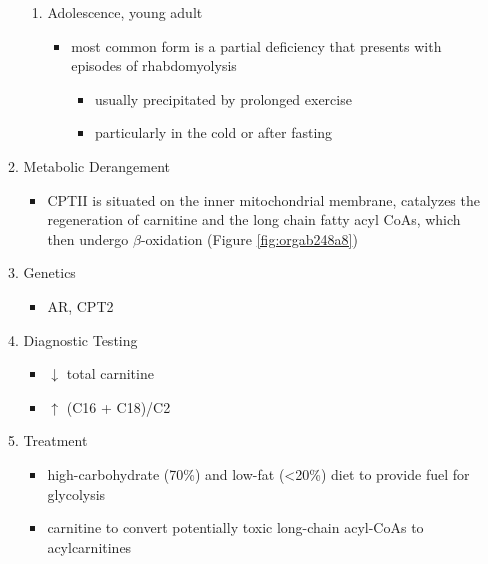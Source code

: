 \documentclass{scrartcl}
\begin{document}
\begin{enumerate}
\begin{enumerate}
\begin{enumerate}
\item Adolescence,  young adult
\label{sec:orge1957a0}
\begin{itemize}
\item most common form is a partial deficiency that presents with
episodes of rhabdomyolysis
\begin{itemize}
\item usually precipitated by prolonged exercise
\item particularly in the cold or after fasting
\end{itemize}
\end{itemize}
\end{enumerate}

\item Metabolic Derangement
\label{sec:org75e8d84}
\begin{itemize}
\item CPTII is situated on the inner mitochondrial membrane, catalyzes the
regeneration of carnitine and the long chain fatty acyl CoAs, which
then undergo \(\beta\)-oxidation (Figure \ref{fig:orgab248a8})
\end{itemize}
\item Genetics
\label{sec:orgf4c355b}
\begin{itemize}
\item AR, CPT2
\end{itemize}
\item Diagnostic Testing
\label{sec:orge432b8f}
\begin{itemize}
\item \(\downarrow\) total carnitine
\item \(\uparrow\) (C16 + C18)/C2
\end{itemize}

\item Treatment
\label{sec:org4908f09}
\begin{itemize}
\item high-carbohydrate (70\%) and low-fat (<20\%) diet to provide fuel for glycolysis
\item carnitine to convert potentially toxic long-chain acyl-CoAs to
acylcarnitines
\end{itemize}
\end{enumerate}
\end{enumerate}
\end{document}
